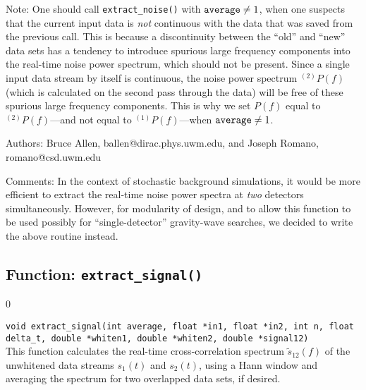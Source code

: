 Note: One should call {\tt extract\_noise()} with 
${\tt average}\ne 1$, when one suspects that the current input data is 
{\it not} continuous with the data that was saved from the previous call.
This is because a discontinuity between the ``old'' and ``new'' data 
sets has a tendency to introduce spurious large frequency components 
into the real-time noise power spectrum, which should not be present.
Since a single input data stream by itself is continuous,  
the noise power spectrum ${}^{(2)}P(f)$ (which is calculated on the 
second pass through the data) will be free of these spurious large 
frequency components.
This is why we set $P(f)$ equal to ${}^{(2)}P(f)$---and not equal to 
${}^{(1)}P(f)$---when ${\tt average}\ne 1$.
%
\begin{description}
\item{Authors:}
Bruce Allen, ballen@dirac.phys.uwm.edu, and Joseph Romano, romano@csd.uwm.edu
\item{Comments:} 
In the context of stochastic background simulations, it would be
more efficient to extract the real-time noise power spectra at {\it two}
detectors simultaneously.
However, for modularity of design, and to allow this function to be
used possibly for ``single-detector'' gravity-wave searches, we decided 
to write the above routine instead.
\end{description}
\clearpage

\subsection{Function: {\tt extract\_signal()}}
\label{subsec:extract_signal}
\setcounter{equation}0

{\tt void extract\_signal(int average, float *in1, float *in2, int n, 
float delta\_t, double *whiten1, double *whiten2, double *signal12)}\\
%
This function calculates the real-time cross-correlation spectrum 
$\tilde s_{12}(f)$ of the unwhitened data streams $s_1(t)$ and $s_2(t)$,
using a Hann window and averaging the spectrum for two overlapped
data sets, if desired.

